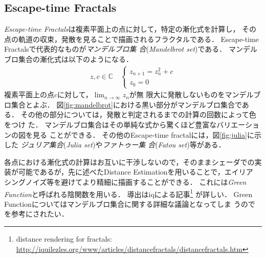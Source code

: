 \subsection{Escape-time Fractals}

\textit{Escape-time Fractals}は複素平面上の点に対して，特定の漸化式を計算し，
その点の軌道の収束，発散を見ることで描画されるフラクタルである．
Escape-time Fractalsで代表的なものが\emph{マンデルブロ集
合}(\textit{Mandelbrot set})である．
マンデルブロ集合の漸化式は以下のようになる．
\begin{align*}
 z, c \in \mathbb{C} \quad
 \begin{cases}
  z_{n+1} = z^2_{n} + c \\ z_0 = 0
 \end{cases}
\end{align*}
複素平面上の点$c$に対して，$\displaystyle \lim_{n \to \infty} z_n$が無
限大に発散しないものをマンデルブロ集合とよぶ．
図\ref{fig:mandelbrot}における黒い部分がマンデルブロ集合である．
その他の部分については，発散と判定されるまでの計算の回数によって色をつけ
た．
マンデルブロ集合はその単純な式から驚くほど豊富なバリエーションの図を見る
ことができる．
その他のEscape-time fractalには，図\ref{fig:julia}に示した
\emph{ジュリア集合}(\textit{Julia set})や\emph{ファトゥー集
合}(\textit{Fatou set})等がある．

各点における漸化式の計算はお互いに干渉しないので，そのままシェーダでの実
装が可能であるが，先に述べたDistance Estimationを用いることで，エイリア
シングノイズ等を避けてより精細に描画することができる．
これには\textit{Green Function}と呼ばれる陰関数を用いる．
導出はiqによる記事\footnote{distance rendering for fractals:
\url{http://iquilezles.org/www/articles/distancefractals/distancefractals.htm}}
が詳しい．
Green Functionについてはマンデルブロ集合に関する詳細な議論となってしま
うので\cite{douady1984exploring}を参考にされたい．

